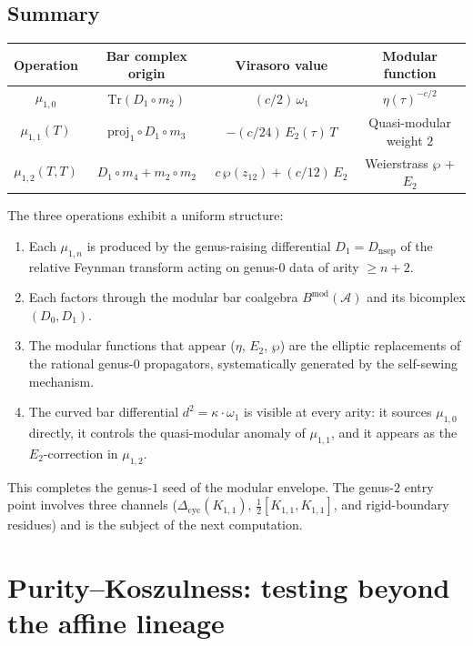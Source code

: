 \documentclass[11pt]{article}
\newcommand{\cA}{\mathcal{A}}
\providecommand{\Bmod}{B^{\mathrm{mod}}}
\begin{document}
\subsection{Summary}

\begin{center}
\renewcommand{\arraystretch}{1.5}
\begin{tabular}{@{}cccc@{}}
\toprule
Operation & Bar complex origin & Virasoro value & Modular function \\
\midrule
$\mu_{1,0}$ & $\mathrm{Tr}(D_1 \circ m_2)$
  & $(c/2)\,\omega_1$
  & $\eta(\tau)^{-c/2}$ \\
$\mu_{1,1}(T)$ & $\mathrm{proj}_1 \circ D_1 \circ m_3$
  & $-(c/24)\,E_2(\tau)\,T$
  & Quasi-modular weight $2$ \\
$\mu_{1,2}(T,T)$ & $D_1 \circ m_4 + m_2 \circ m_2$
  & $c\,\wp(z_{12}) + (c/12)\,E_2$
  & Weierstrass $\wp$ + $E_2$ \\
\bottomrule
\end{tabular}
\end{center}

The three operations exhibit a uniform structure:
\begin{enumerate}[label=\textup{(\roman*)}]
\item Each $\mu_{1,n}$ is produced by the genus-raising differential
  $D_1 = D_{\mathrm{nsep}}$ of the relative Feynman transform
  acting on genus-$0$ data of arity $\geq n+2$.
\item Each factors through the modular bar coalgebra $\Bmod(\cA)$
  and its bicomplex $(D_0, D_1)$.
\item The modular functions that appear ($\eta$, $E_2$, $\wp$) are
  the elliptic replacements of the rational genus-$0$ propagators,
  systematically generated by the self-sewing mechanism.
\item The curved bar differential $d^2 = \kappa \cdot \omega_1$ is
  visible at every arity: it sources $\mu_{1,0}$ directly, it
  controls the quasi-modular anomaly of $\mu_{1,1}$, and it appears
  as the $E_2$-correction in $\mu_{1,2}$.
\end{enumerate}

This completes the genus-$1$ seed of the modular envelope.  The
genus-$2$ entry point involves three channels
($\Delta_{\mathrm{cyc}}(K_{1,1})$, $\frac{1}{2}[K_{1,1},K_{1,1}]$,
and rigid-boundary residues) and is the subject of the next computation.


\section{Purity--Koszulness: testing beyond the affine lineage}
\label{sec:purity-koszul-beyond-affine}
\end{document}
